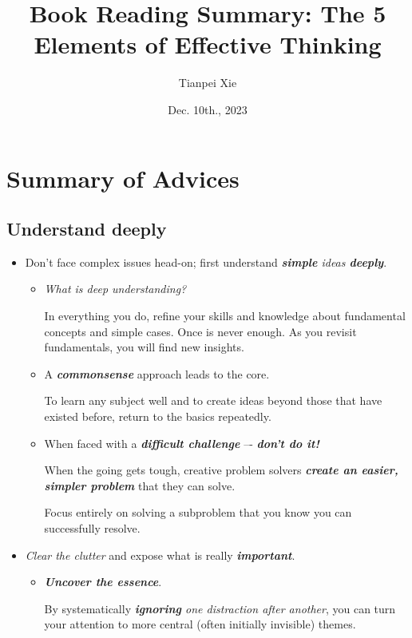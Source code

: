 \documentclass[11pt]{article}
\begin{document}
\title{Book Reading Summary: The 5 Elements of Effective Thinking}
\author{ Tianpei Xie}
\date{Dec. 10th., 2023}
\maketitle
\tableofcontents
\newpage
\section{Summary of Advices}
\subsection{Understand deeply}
\begin{itemize}
\item Don’t face complex issues head-on; first understand \emph{\textbf{simple} ideas \textbf{deeply}}. 
\begin{itemize}
\item \emph{What is deep understanding?}

In everything you do, refine your skills and knowledge about fundamental concepts and simple cases. Once is never enough. As you revisit fundamentals, you will find new insights.

\item A \emph{\textbf{commonsense}} approach leads to the core. 

To learn any subject well and to create ideas beyond those that have existed before, return
to the basics repeatedly.

\item When faced with a \emph{\textbf{difficult challenge}} –- \emph{\textbf{don’t do it!}}

When the going gets tough, creative problem solvers \emph{\textbf{create an easier, simpler problem}} that they can solve.

Focus entirely on solving a subproblem that you know you can successfully resolve.
\end{itemize}

\item \emph{Clear the clutter} and expose what is really \emph{\textbf{important}}. 
\begin{itemize}
\item \emph{\textbf{Uncover the essence}}. 

By systematically \emph{\textbf{ignoring} one distraction after another}, you can turn your attention to more central (often initially invisible) themes.
\end{itemize}


\end{itemize}
\end{document}
